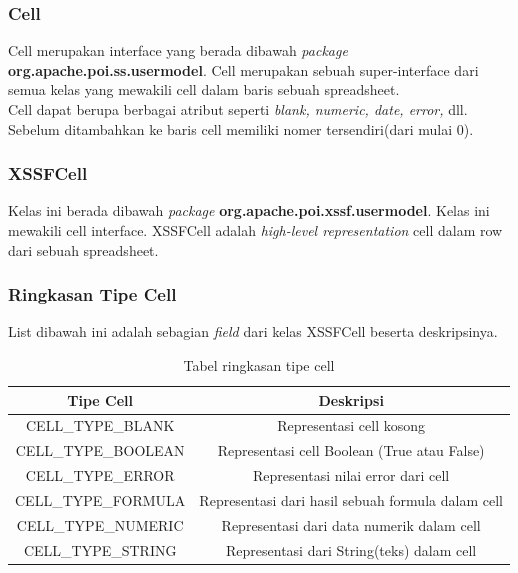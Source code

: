 \subsubsection{Cell}
\label{subs:Cell}
Cell merupakan interface yang berada dibawah \textit{package} \textbf{org.apache.poi.ss.usermodel}. Cell merupakan sebuah super-interface dari semua kelas yang mewakili cell dalam baris sebuah spreadsheet.\\

Cell dapat berupa berbagai atribut seperti \textit{blank, numeric, date, error, } dll. Sebelum ditambahkan ke baris cell memiliki nomer tersendiri(dari mulai 0).\cite{apachepoi2}

\subsubsection{XSSFCell}
\label{subs:XSSFCell}  
Kelas ini berada dibawah \textit{package} \textbf{org.apache.poi.xssf.usermodel}. Kelas ini mewakili cell interface. XSSFCell adalah \textit{high-level representation} cell dalam row dari sebuah spreadsheet.\cite{apachepoi2}

\subsubsection{Ringkasan Tipe Cell}
\label{subs:Ringkasan_Tipe_Cell}
List dibawah ini adalah sebagian \textit{field} dari kelas XSSFCell beserta deskripsinya.
\begin{table}[H]
		\centering
		\caption{Tabel ringkasan tipe cell}
		\label{tab:ringkasan_tipe_cell}
	\begin{tabular}{|c|c|}
		\hline
		\textbf{Tipe Cell} & \textbf{Deskripsi} \\ \hline \hline
		CELL\_TYPE\_BLANK & Representasi cell kosong\\ \hline 
		CELL\_TYPE\_BOOLEAN &	Representasi cell Boolean (True atau False)\\ \hline 
		CELL\_TYPE\_ERROR & Representasi nilai error dari cell\\ \hline
		CELL\_TYPE\_FORMULA	&	Representasi dari hasil sebuah formula dalam cell\\ \hline
		CELL\_TYPE\_NUMERIC	&	Representasi dari data numerik dalam cell\\ \hline
		CELL\_TYPE\_STRING	&	Representasi dari String(teks) dalam cell\\ \hline
	\end{tabular}
\end{table}
	

